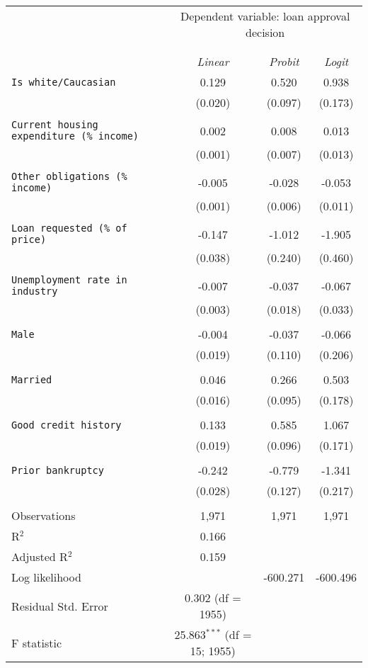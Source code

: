   \begin{tabular}{lccc}
  \toprule
    & \multicolumn{3}{c}{Dependent variable: loan approval decision} \\
    \cline{2-4} \\
    \\[-3ex]& \textit{Linear} & \textit{Probit} & \textit{Logit} \\
  \midrule
   \texttt{Is white/Caucasian} & 0.129& 0.520 & 0.938 \\ 
    & (0.020) & (0.097) & (0.173) \\ 
    & & & \\ 
   \texttt{Current housing expenditure (\% income)} & 0.002 & 0.008 & 0.013 \\ 
    & (0.001) & (0.007) & (0.013) \\ 
    & & & \\ 
   \texttt{Other obligations (\% income)} & -0.005 & -0.028 & -0.053\\ 
    & (0.001) & (0.006) & (0.011) \\ 
    & & & \\ 
   \texttt{Loan requested (\% of price)} & -0.147 & -1.012 & -1.905 \\ 
    & (0.038) & (0.240) & (0.460) \\ 
    & & & \\ 
   \texttt{Unemployment rate in industry} & -0.007 & -0.037 & -0.067 \\ 
    & (0.003) & (0.018) & (0.033) \\ 
    & & & \\ 
   \texttt{Male} & -0.004 & -0.037 & -0.066 \\ 
    & (0.019) & (0.110) & (0.206) \\ 
    & & & \\ 
   \texttt{Married} & 0.046 & 0.266 & 0.503 \\ 
    & (0.016) & (0.095) & (0.178) \\ 
    & & & \\ 
   \texttt{Good credit history} & 0.133 & 0.585 & 1.067 \\ 
    & (0.019) & (0.096) & (0.171) \\ 
    & & & \\ 
   \texttt{Prior bankruptcy} & -0.242 & -0.779 & -1.341 \\ 
    & (0.028) & (0.127) & (0.217) \\ 
    & & & \\ 
  \midrule
  Observations & \multicolumn{1}{c}{1,971} & \multicolumn{1}{c}{1,971} & \multicolumn{1}{c}{1,971} \\ 
  R$^{2}$ & \multicolumn{1}{c}{0.166} &  &  \\ 
  Adjusted R$^{2}$ & \multicolumn{1}{c}{0.159} &  &  \\ 
  Log likelihood &  & \multicolumn{1}{c}{-600.271} & \multicolumn{1}{c}{-600.496} \\ 
  Residual Std. Error & \multicolumn{1}{c}{0.302 (df = 1955)} &  &  \\ 
  F statistic & \multicolumn{1}{c}{25.863$^{***}$ (df = 15; 1955)} &  &  \\ 
  \bottomrule 
  \end{tabular} 
